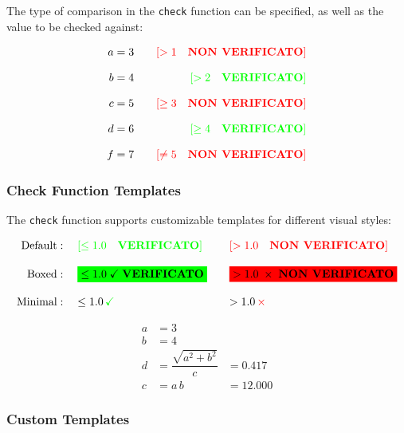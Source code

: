 \documentclass[
  letterpaper,
  DIV=11,
  numbers=noendperiod,
  fleqn]{scrartcl}
\begin{document}
The type of comparison in the \texttt{check} function can be specified,
as well as the value to be checked against:

\begin{align}
a & = 3 & \quad\text{$\textcolor{red}{\left[>1\quad \textbf{NON VERIFICATO}\right]}$}  \\[8pt]
 b & = 4 & \quad\text{$\textcolor{green}{\left[>2\quad \textbf{VERIFICATO}\right]}$}  \\[8pt]
 c & = 5 & \quad\text{$\textcolor{red}{\left[\ge3\quad \textbf{NON VERIFICATO}\right]}$}  \\[8pt]
 d & = 6 & \quad\text{$\textcolor{green}{\left[\ge4\quad \textbf{VERIFICATO}\right]}$}  \\[8pt]
 f & = 7 & \quad\text{$\textcolor{red}{\left[\neq5\quad \textbf{NON VERIFICATO}\right]}$} 
\end{align}

\subsubsection{Check Function Templates}\label{check-function-templates}

The \texttt{check} function supports customizable templates for
different visual styles:

\begin{align*}
\text{Default} & :\quad\text{$\textcolor{green}{\left[\le1.0\quad \textbf{VERIFICATO}\right]}$} & &\quad\text{$\textcolor{red}{\left[>1.0\quad \textbf{NON VERIFICATO}\right]}$}  \\[8pt]
 \text{Boxed} & :\quad\text{\colorbox{green}{$\le1.0 \; \checkmark \; \textbf{VERIFICATO}$}} & &\quad\text{\colorbox{red}{$>1.0 \; \times \; \textbf{NON VERIFICATO}$}}  \\[8pt]
 \text{Minimal} & :\quad\text{$\le1.0 {\,}\textcolor{green}{\checkmark}$} & &\quad\text{$>1.0 {\,}\textcolor{red}{\times}$} 
\end{align*}

\begin{align}
a & = 3 &    \\[8pt]
 b & = 4 &    \\[8pt]
 d & = \dfrac{\sqrt{a^{2} + b^{2}}}{c} & = 0.417  \\[8pt]
 c & = a{\,}b & = 12.000 
\end{align}

\subsubsection{Custom Templates}\label{custom-templates}
\end{document}
